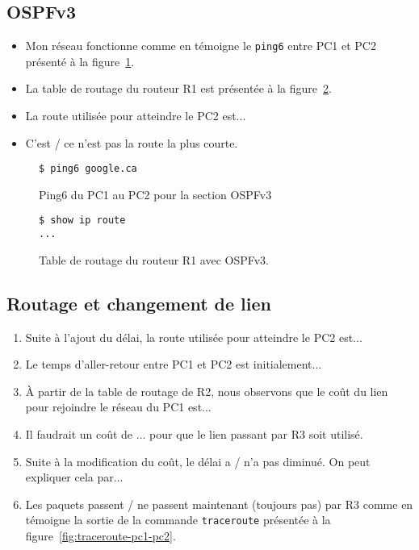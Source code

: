 \documentclass[]{article}
\begin{document}
\subsection*{OSPFv3}

\begin{itemize}
      \item  Mon réseau fonctionne comme en témoigne le \texttt{ping6} entre PC1 et PC2
             présenté à la figure~\ref{fig:ping6-pc1-pc2-ospfv2}.
      \item  La table de routage du routeur R1 est présentée à la figure~\ref{fig:ospfv3-routes-r1}.
      \item  La route utilisée pour atteindre le PC2 est...
      \item  C'est / ce n'est pas la route la plus courte.
\end{itemize}


\begin{figure} 
      \centering
      \begin{lstlisting}
$ ping6 google.ca
      \end{lstlisting}
      \caption[]{Ping6 du PC1 au PC2 pour la section OSPFv3}
      \label{fig:ping6-pc1-pc2-ospfv2}
\end{figure}


\begin{figure} 
      \centering
      \begin{lstlisting}
$ show ip route
...
      \end{lstlisting}
      \caption[]{Table de routage du routeur R1 avec OSPFv3.}
      \label{fig:ospfv3-routes-r1}
\end{figure}


\subsection*{Routage et changement de lien}

\begin{enumerate}
      \item  Suite à l'ajout du délai, la route utilisée pour atteindre le PC2 est...
      \item Le temps d'aller-retour entre PC1 et PC2 est initialement...
      \item À partir de la table de routage de R2, nous observons que le coût du lien pour rejoindre 
            le réseau du PC1 est...
      \item Il faudrait un coût de ... pour que le lien passant par R3 soit utilisé.
      \item Suite à la modification du coût, le délai a / n'a pas diminué. On peut expliquer cela par...
      \item Les paquets passent / ne passent maintenant (toujours pas) par R3 comme en témoigne la sortie
            de la commande \texttt{traceroute} présentée à la figure~\ref{fig:traceroute-pc1-pc2}.
\end{enumerate}
\end{document}
